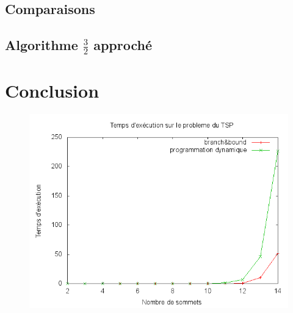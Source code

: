 \subsection{Comparaisons}


\subsection{Algorithme $\frac{3}{2}$ approché}



\section{Conclusion}


\begin{figure}[H]
	\includegraphics[width=\linewidth]{../pratique/comp.png}
\end{figure}


